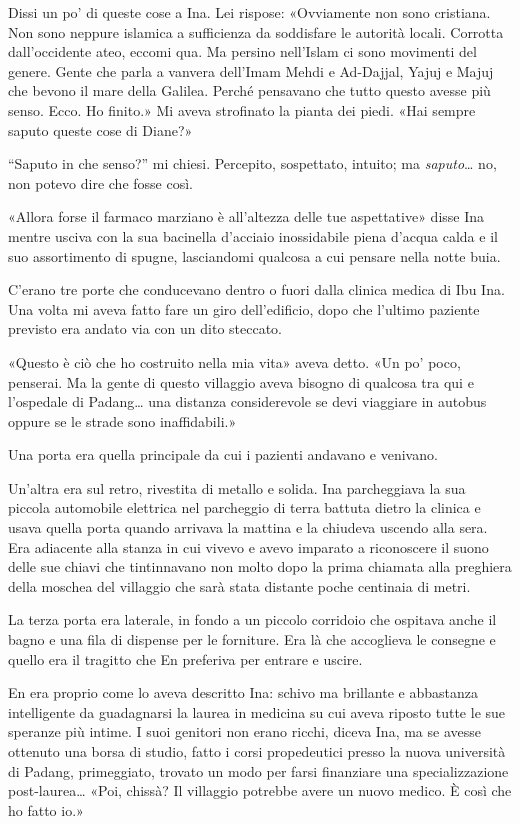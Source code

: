 Dissi un po' di queste cose a Ina. Lei rispose: «Ovviamente non sono
cristiana. Non sono neppure islamica a sufficienza da soddisfare le
autorità locali. Corrotta dall'occidente ateo, eccomi qua. Ma persino
nell'Islam ci sono movimenti del genere. Gente che parla a vanvera
dell'Imam Mehdi e Ad-Dajjal, Yajuj e Majuj che bevono il mare della
Galilea. Perché pensavano che tutto questo avesse più senso. Ecco. Ho
finito.» Mi aveva strofinato la pianta dei piedi. «Hai sempre saputo
queste cose di Diane?»

``Saputo in che senso?'' mi chiesi. Percepito, sospettato, intuito; ma
\emph{saputo}\ldots{} no, non potevo dire che fosse così.

«Allora forse il farmaco marziano è all'altezza delle tue aspettative»
disse Ina mentre usciva con la sua bacinella d'acciaio inossidabile
piena d'acqua calda e il suo assortimento di spugne, lasciandomi
qualcosa a cui pensare nella notte buia.

\separatorefiori

C'erano tre porte che conducevano dentro o fuori dalla clinica medica di
Ibu Ina. Una volta mi aveva fatto fare un giro dell'edificio, dopo che
l'ultimo paziente previsto era andato via con un dito steccato.

«Questo è ciò che ho costruito nella mia vita» aveva detto. «Un po'
poco, penserai. Ma la gente di questo villaggio aveva bisogno di
qualcosa tra qui e l'ospedale di Padang\ldots{} una distanza
considerevole se devi viaggiare in autobus oppure se le strade sono
inaffidabili.»

Una porta era quella principale da cui i pazienti andavano e venivano.

Un'altra era sul retro, rivestita di metallo e solida. Ina parcheggiava
la sua piccola automobile elettrica nel parcheggio di terra battuta
dietro la clinica e usava quella porta quando arrivava la mattina e la
chiudeva uscendo alla sera. Era adiacente alla stanza in cui vivevo e
avevo imparato a riconoscere il suono delle sue chiavi che tintinnavano
non molto dopo la prima chiamata alla preghiera della moschea del
villaggio che sarà stata distante poche centinaia di metri.

La terza porta era laterale, in fondo a un piccolo corridoio che
ospitava anche il bagno e una fila di dispense per le forniture. Era là
che accoglieva le consegne e quello era il tragitto che En preferiva per
entrare e uscire.

En era proprio come lo aveva descritto Ina: schivo ma brillante e
abbastanza intelligente da guadagnarsi la laurea in medicina su cui
aveva riposto tutte le sue speranze più intime. I suoi genitori non
erano ricchi, diceva Ina, ma se avesse ottenuto una borsa di studio,
fatto i corsi propedeutici presso la nuova università di Padang,
primeggiato, trovato un modo per farsi finanziare una specializzazione
post-laurea\ldots{} «Poi, chissà? Il villaggio potrebbe avere un nuovo
medico. È così che ho fatto io.»


